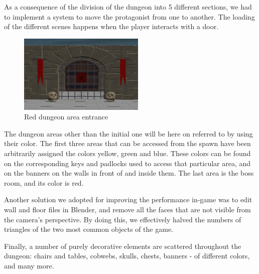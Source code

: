 As a consequence of the division of the dungeon into 5 different sections, we had to implement a system to move the protagonist from one to another.
The loading of the different scenes happens when the player interacts with a door.

\begin{figure}
    \centering
    \vspace{-15pt}
    \includegraphics[width=170pt]{images/ch4/red-entrance.png}
    \caption{Red dungeon area entrance}
\end{figure}

The dungeon areas other than the initial one will be here on referred to by using their color. The first three areas that can be accessed from the spawn have been arbitrarily assigned the colors yellow, green and blue. These colors can be found on the corresponding keys and padlocks used to access that particular area, and on the banners on the walls in front of and inside them. The last area is the boss room, and its color is red.

\newpage

Another solution we adopted for improving the performance in-game was to edit wall and floor files in Blender, and remove all the faces that are not visible from the camera's perspective. By doing this, we effectively halved the numbers of triangles of the two most common objects of the game.

Finally, a number of purely decorative elements are scattered throughout the dungeon: chairs and tables, cobwebs, skulls, chests, banners - of different colors, and many more.

